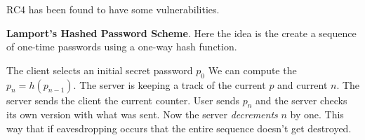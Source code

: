 \documentclass{report}
\begin{document}
RC4 has been found to have some vulnerabilities.

\textbf{Lamport's Hashed Password Scheme}. Here
the idea is the create a sequence of one-time passwords using a one-way hash
function.

The client selects an initial secret password $p_0$
We can compute the $p_n = h(p_{n-1})$.
The server is keeping a track of the current $p$ and current $n$.
The server sends the client the current counter.
User sends $p_n$ and the server checks its own version with what was sent.
Now the server \textit{decrements} $n$ by one.
This way that if eavesdropping occurs
that the entire sequence doesn't get destroyed.

\end{document}
